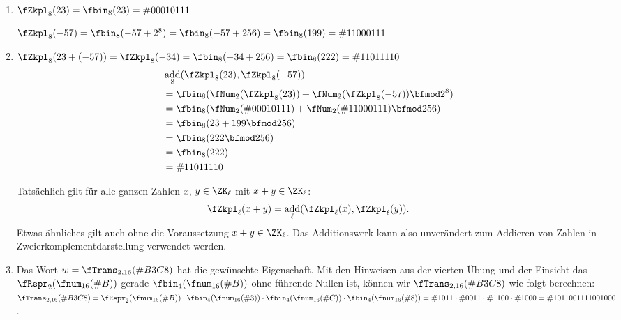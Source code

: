 \documentclass[12pt]{article}
\DeclareMathOperator{\add}{add}
\begin{document}
\begin{loesung}
  \begin{enumerate}
    \item $\fZkpl_8(23) = \fbin_8(23) = \#{00010111}$

          $\fZkpl_8(-57) = \fbin_8(-57 + 2^8) = \fbin_8(-57 + 256) = \fbin_8(199) = \#{11000111}$
    \item $\fZkpl_8(23 + (-57)) = \fZkpl_8(-34) = \fbin_8(-34 + 256) = \fbin_8(222) = \#{11011110}$
          \begin{align*}
            &\add_8(\fZkpl_8(23), \fZkpl_8(-57))\\
            &= \fbin_8(\fNum_2(\fZkpl_8(23)) + \fNum_2(\fZkpl_8(-57)) \bfmod 2^8)\\
            &= \fbin_8(\fNum_2(\#{00010111}) + \fNum_2(\#{11000111}) \bfmod 256)\\
            &= \fbin_8(23 + 199 \bfmod 256)\\
            &= \fbin_8(222 \bfmod 256)\\
            &= \fbin_8(222)\\
            &= \#{11011110}
          \end{align*}

          Tatsächlich gilt für alle ganzen Zahlen $x$, $y \in \ZK_{\ell}$ mit
          $x + y \in \ZK_{\ell}$:
          \begin{equation*}
            \fZkpl_{\ell}(x + y) = \add_{\ell}(\fZkpl_{\ell}(x), \fZkpl_{\ell}(y)).
          \end{equation*}
          Etwas ähnliches gilt auch ohne die Voraussetzung $x + y \in \ZK_{\ell}$.
          Das Additionswerk kann also unverändert zum Addieren von Zahlen in
          Zweierkomplementdarstellung verwendet werden.
    \item Das Wort $w = \fTrans_{2,16}(\#{B3C8})$ hat die gewünschte Eigenschaft. Mit den Hinweisen aus der vierten Übung und der Einsicht das $\fRepr_2(\fnum_{16}(\#{B}))$ gerade $\fbin_4(\fnum_{16}(\#{B}))$ ohne führende Nullen ist, können wir $\fTrans_{2,16}(\#{B3C8})$ wie folgt berechnen: $\fTrans_{2,16}(\#{B3C8}) = \fRepr_2(\fnum_{16}(\#{B})) \cdot \fbin_4(\fnum_{16}(\#{3})) \cdot \fbin_4(\fnum_{16}(\#{C})) \cdot \fbin_4(\fnum_{16}(\#{8})) = \#{1011} \cdot \#{0011} \cdot \#{1100} \cdot \#{1000} = \#{1011001111001000}$.
  \end{enumerate}
\end{loesung}

\end{document}
